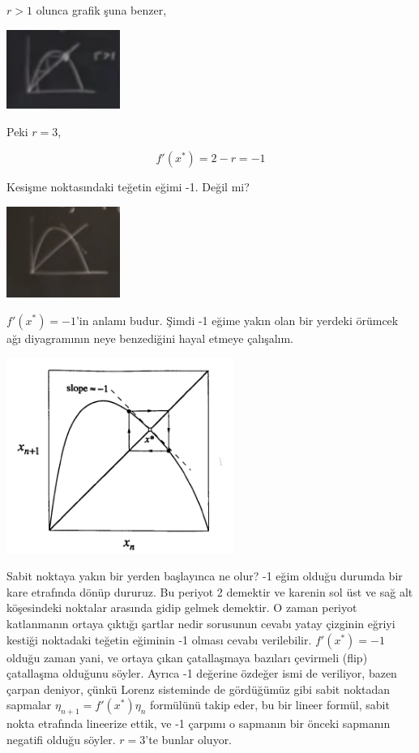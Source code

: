 \documentclass[12pt,fleqn]{article}\usepackage{../../common}
\begin{document}
$r>1$ olunca grafik şuna benzer,

\includegraphics[width=10em]{19_12.png}

Peki $r=3$,

$$ f'(x^\ast) = 2-r = -1 $$

Kesişme noktasındaki teğetin eğimi -1. Değil mi? 

\includegraphics[width=10em]{19_13.png}

$f'(x^\ast)=-1$'in anlamı budur. Şimdi -1 eğime yakın olan bir yerdeki örümcek
ağı diyagramının neye benzediğini hayal etmeye çalışalım.

\includegraphics[width=20em]{19_14.png}

Sabit noktaya yakın bir yerden başlayınca ne olur? -1 eğim olduğu durumda
bir kare etrafında dönüp dururuz. Bu periyot 2 demektir ve karenin sol üst
ve sağ alt köşesindeki noktalar arasında gidip gelmek demektir. O zaman
periyot katlanmanın ortaya çıktığı şartlar nedir sorusunun cevabı yatay
çizginin eğriyi kestiği noktadaki teğetin eğiminin -1 olması cevabı
verilebilir. $f'(x^\ast)=-1$ olduğu zaman yani, ve ortaya çıkan çatallaşmaya
bazıları çevirmeli (flip) çatallaşma olduğunu söyler. Ayrıca -1 değerine
özdeğer ismi de veriliyor, bazen çarpan deniyor, çünkü Lorenz sisteminde de
gördüğümüz gibi sabit noktadan sapmalar $\eta_{n+1} = f'(x^\ast)\eta_n$
formülünü takip eder, bu bir lineer formül, sabit nokta etrafında lineerize
ettik, ve -1 çarpımı o sapmanın bir önceki sapmanın negatifi olduğu
söyler. $r=3$'te bunlar oluyor.
\end{document}
